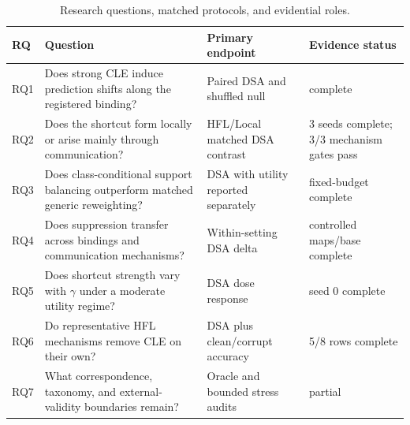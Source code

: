 \begin{table}[t]
\centering
\small
\caption{Research questions, matched protocols, and evidential roles.}
\label{tab:research-questions}
\begin{tabularx}{\textwidth}{lXll}
\toprule
RQ & Question & Primary endpoint & Evidence status \\
\midrule
RQ1 & Does strong CLE induce prediction shifts along the registered binding? & Paired DSA and shuffled null & complete \\
RQ2 & Does the shortcut form locally or arise mainly through communication? & HFL/Local matched DSA contrast & 3 seeds complete; 3/3 mechanism gates pass \\
RQ3 & Does class-conditional support balancing outperform matched generic reweighting? & DSA with utility reported separately & fixed-budget complete \\
RQ4 & Does suppression transfer across bindings and communication mechanisms? & Within-setting DSA delta & controlled maps/base complete \\
RQ5 & Does shortcut strength vary with \(\gamma\) under a moderate utility regime? & DSA dose response & seed 0 complete \\
RQ6 & Do representative HFL mechanisms remove CLE on their own? & DSA plus clean/corrupt accuracy & 5/8 rows complete \\
RQ7 & What correspondence, taxonomy, and external-validity boundaries remain? & Oracle and bounded stress audits & partial \\
\bottomrule
\end{tabularx}
\end{table}
